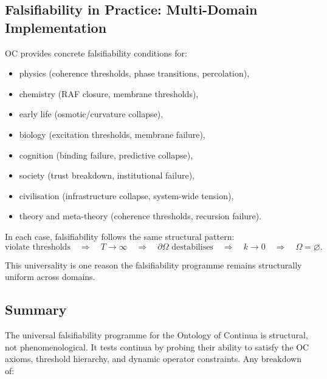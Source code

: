 \subsection{Falsifiability in Practice: Multi-Domain Implementation}

OC provides concrete falsifiability conditions for:

\begin{itemize}
    \item physics (coherence thresholds, phase transitions, percolation),
    \item chemistry (RAF closure, membrane thresholds),
    \item early life (osmotic/curvature collapse),
    \item biology (excitation thresholds, membrane failure),
    \item cognition (binding failure, predictive collapse),
    \item society (trust breakdown, institutional failure),
    \item civilisation (infrastructure collapse, system-wide tension),
    \item theory and meta-theory (coherence thresholds, recursion failure).
\end{itemize}

In each case, falsifiability follows the same structural pattern:
\[
\text{violate thresholds} 
\quad \Rightarrow \quad
T \to \infty 
\quad \Rightarrow \quad
\partial\Omega \text{ destabilises} 
\quad \Rightarrow \quad
k \to 0 
\quad \Rightarrow \quad
\Omega = \varnothing.
\]

This universality is one reason the falsifiability programme remains
structurally uniform across domains.



\subsection{Summary}

The universal falsifiability programme for the Ontology of Continua is
structural, not phenomenological.
It tests continua by probing their ability to satisfy the OC axioms,
threshold hierarchy, and dynamic operator constraints.
Any breakdown of:

